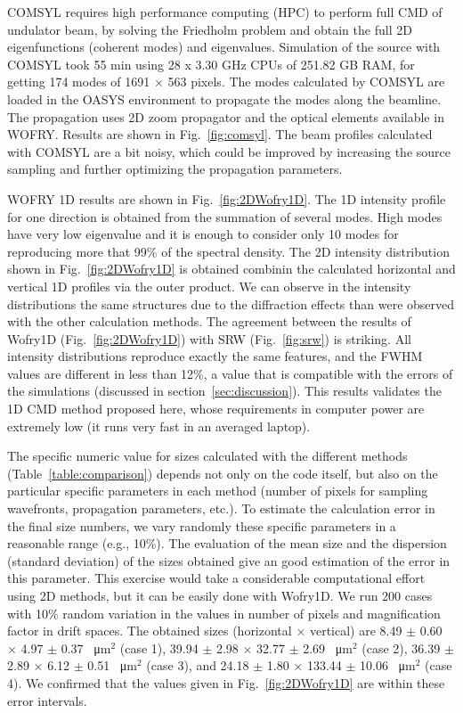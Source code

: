 \documentclass{iucr}              %
\begin{document}
COMSYL requires high performance computing (HPC) to perform full CMD of undulator beam, by
solving the Friedholm problem and obtain the full 2D eigenfunctions (coherent modes) and eigenvalues.
Simulation of the source with COMSYL took 55 min using 28 x 3.30 GHz CPUs of 251.82 GB RAM, for getting 174 modes of 1691 $\times$ 563 pixels.
The modes calculated by COMSYL are loaded in the OASYS environment \cite{codeOASYS} to propagate the modes along the beamline.
The propagation uses 2D zoom propagator and the optical elements available in WOFRY. Results are shown in Fig.~\ref{fig:comsyl}. 
The beam profiles calculated with COMSYL are a bit noisy, which could be improved by increasing the source sampling and further optimizing the propagation parameters. 


WOFRY 1D results are shown in Fig.~\ref{fig:2DWofry1D}. The 1D intensity profile for one direction is obtained from the summation of several modes. High modes have very low eigenvalue and it is enough to consider only 10 modes for reproducing more that 99\% of the spectral density. The 2D intensity distribution shown in Fig.~\ref{fig:2DWofry1D} is obtained combinin the calculated horizontal and vertical 1D profiles via the outer product. We can observe in the intensity distributions the same structures due to the diffraction effects than were observed with the other calculation methods. 
The agreement between the results of  Wofry1D (Fig.~\ref{fig:2DWofry1D}) with SRW (Fig.~\ref{fig:srw}) is striking. All intensity distributions reproduce exactly the same features, and the FWHM values are different in less than 12\%, a value that is compatible with the errors of the simulations (discussed in section~\ref{sec:discussion}). This results validates the 1D CMD method proposed here, whose requirements in computer power are extremely low (it runs very fast in an averaged laptop).  

The specific numeric value for sizes calculated with the different methods (Table~\ref{table:comparison}) depends not only on the code itself, but also on the particular specific parameters in each method (number of pixels for sampling wavefronts, propagation parameters, etc.). To estimate the calculation error in the final size numbers, we vary randomly these specific parameters in a reasonable range (e.g., 10\%). The evaluation of the mean size and the dispersion (standard deviation) of the sizes obtained give an good estimation of the error in this parameter. This exercise would take a considerable computational effort using 2D methods, but it can be easily done with Wofry1D. We run 200 cases with 10\% random variation in the values in number of pixels and magnification factor in drift spaces. The obtained sizes (horizontal $\times$ vertical) are  
8.49 $\pm$ 0.60 $\times$ 4.97 $\pm$ 0.37 \SI{}{\micro\meter}$^2$ (case 1),
39.94 $\pm$ 2.98 $\times$ 32.77 $\pm$ 2.69 \SI{}{\micro\meter}$^2$ (case 2),
36.39 $\pm$ 2.89 $\times$ 6.12 $\pm$ 0.51 \SI{}{\micro\meter}$^2$ (case 3), and
24.18 $\pm$ 1.80 $\times$ 133.44 $\pm$ 10.06 \SI{}{\micro\meter}$^2$ (case 4). We confirmed that the values given in Fig.~\ref{fig:2DWofry1D} are within these error intervals.
\end{document}
